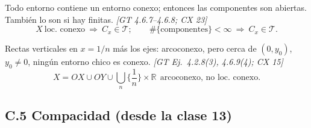 \documentclass[11pt,a4paper]{article}
\theoremstyle{definition}
\theoremstyle{plain}
\newcommand{\fnt}[1]{{\normalfont\small\itshape\color{gray!150!black}[#1]}}
\newcommand{\R}{\mathbb{R}}
\newcommand{\tp}{\mathcal{T}}
\begin{document}
\begin{itemize}[leftmargin=1.3em,itemsep=3pt]
 Todo entorno contiene un entorno conexo; entonces las componentes son abiertas. También lo son si hay finitas. \fnt{GT 4.6.7--4.6.8; CX 23}
\[ X\ \text{loc.\ conexo}\ \Rightarrow\ C_x\in\tp;\qquad \#\{\text{componentes}\}<\infty\ \Rightarrow\ C_x\in\tp. \]

 Rectas verticales en $x=1/n$ más los ejes: arcoconexo, pero cerca de $(0,y_0)$, $y_0\ne0$, ningún entorno chico es conexo. \fnt{GT Ej.\ 4.2.8(3), 4.6.9(4); CX 15}
\[ X=OX\cup OY\cup\textstyle\bigcup_n\{\frac1n\}\times\R\ \ \text{arcoconexo, no loc.\ conexo}. \]

\end{itemize}

\subsection*{C.5 Compacidad \normalfont\small (desde la clase 13)}
\end{document}

